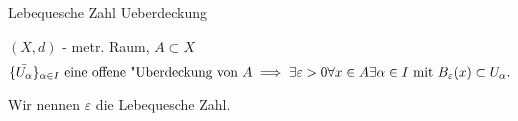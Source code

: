\documentclass[class=article, crop=false]{standalone}
\begin{document}
\begin{zettel}{Lebequesche Zahl Ueberdeckung}
\begin{flashcard}
    $(X,d)$ - metr. Raum, $A \subset X$ 
\[
    \set{ \bar{U_{\alpha}}  }_{\alpha \in  I} \text{ eine offene "Uberdeckung von } A \implies \exists \varepsilon > 0 \forall x \in  A \exists \alpha \in  I \text{ mit } B_{\varepsilon } (x) \subset U_{\alpha } 
.\]

Wir nennen $\varepsilon $ die Lebequesche Zahl.

\end{flashcard}
\end{zettel}
\end{document}

